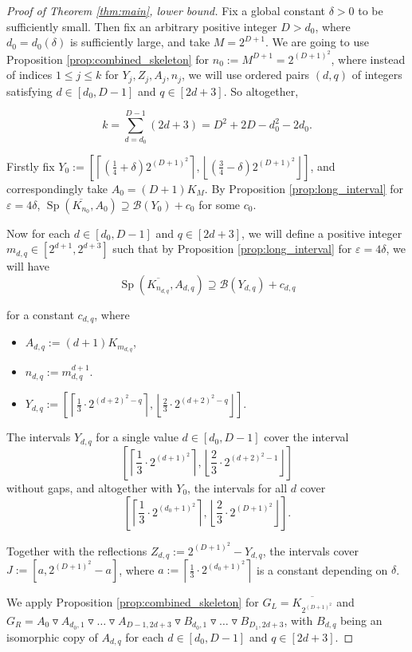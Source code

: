 \documentclass[10pt,a4paper]{article}
\numberwithin{equation}{section}
\newcommand{\eps}{\varepsilon}
\newcommand{\cB}{\mathcal{B}}
\DeclareMathOperator{\Sp}{Sp}
\begin{document}
\begin{proof}[Proof of Theorem \ref{thm:main}, lower bound]
Fix a global constant $\delta>0$ to be sufficiently small. Then fix an arbitrary positive integer $D>d_0$, where $d_0=d_0(\delta)$ is sufficiently large, and take $M=2^{D+1}$. We are going to use Proposition \ref{prop:combined_skeleton} for $n_0:=M^{D+1}=2^{(D+1)^2}$, where instead of indices $1\le j\le k$ for $Y_j,Z_j,A_j,n_j$, we will use ordered pairs $(d,q)$ of integers satisfying $d\in [d_0, D-1]$ and $q\in [2d+3]$. So altogether,

$$k=\sum_{d=d_0}^{D-1} (2d+3)=D^2+2D-d_0^2-2d_0.$$

Firstly fix $Y_0:=\left[\left\lceil \left(\frac14+\delta\right) 2^{(D+1)^2}\right\rceil, \left\lfloor \left(\frac34-\delta\right) 2^{(D+1)^2}\right\rfloor \right]$, and correspondingly take $A_0=(D+1)K_M$. By Proposition \ref{prop:long_interval} for $\eps=4\delta$, $\Sp(\overline{K_{n_0}}, A_0)\supseteq \cB(Y_0)+c_0$ for some $c_0$.

Now for each $d\in [d_0, D-1]$ and $q\in [2d+3]$, we will define a positive integer $m_{d,q}\in [2^{d+1}, 2^{d+3}]$ such that by Proposition \ref{prop:long_interval} for $\eps=4\delta$, we will have
$$\Sp(\overline{K_{n_{d,q}}}, A_{d,q})\supseteq \cB(Y_{d,q})+c_{d,q}$$

for a constant $c_{d,q}$, where
\begin{itemize}
\itemsep0em
\item $A_{d,q}:=(d+1) K_{m_{d,q}}$,
\item $n_{d,q}:=m_{d,q}^{d+1}$.
\item $Y_{d,q}:=\left[\left\lceil \frac13\cdot 2^{(d+2)^2-q}\right\rceil, \left\lfloor \frac23\cdot 2^{(d+2)^2-q}\right\rfloor \right]$.
\end{itemize}

The intervals $Y_{d,q}$ for a single value $d\in [d_0, D-1]$ cover the interval $$\left[\left\lceil \frac13\cdot 2^{(d+1)^2}\right\rceil, \left\lfloor \frac23\cdot 2^{(d+2)^2-1}\right\rfloor \right]$$ without gaps, and altogether with $Y_0$, the intervals for all $d$ cover $$\left[\left\lceil \frac13\cdot 2^{(d_0+1)^2}\right\rceil, \left\lfloor\frac23\cdot 2^{(D+1)^2}\right\rfloor \right].$$

Together with the reflections $Z_{d,q}:=2^{(D+1)^2}-Y_{d,q}$, the intervals cover $J:=[a, 2^{(D+1)^2}-a]$, where $a:=\left\lceil \frac13\cdot 2^{(d_0+1)^2}\right\rceil$ is a constant depending on $\delta$.

We apply Proposition \ref{prop:combined_skeleton} for $G_L=\overline{K_{2^{(D+1)^2}}}$ and $G_R=A_0\triangledown A_{d_0,1}\triangledown \ldots\triangledown A_{D-1,2d+3}\triangledown B_{d_0,1}\triangledown \ldots\triangledown B_{D_1,2d+3}$, with $B_{d,q}$ being an isomorphic copy of $A_{d,q}$ for each $d\in [d_0,D-1]$ and $q\in [2d+3]$.


\end{proof}
\end{document}
